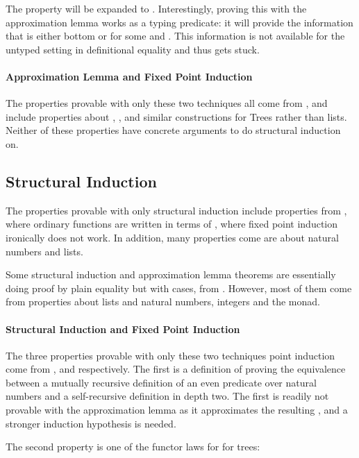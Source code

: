 \noindent
The property will be expanded to .
Interestingly, proving this with the approximation lemma works as a
typing predicate: it will provide the information that  is
either bottom or  for some  and . This
information is not available for the untyped setting in definitional
equality and thus gets stuck.


\paragraph{Approximation Lemma and Fixed Point Induction}
The properties provable with only these two techniques all come from
, and include properties about , ,
 and similar constructions for Trees rather than
lists. Neither of these properties have concrete arguments to do
structural induction on.

\subsection{Structural Induction}
\label{sec:strindres}

The properties provable with only structural induction include
properties from , where ordinary functions are written in
terms of , where fixed point induction ironically does not
work. In addition, many properties come are about natural numbers and
lists.

Some structural induction and approximation lemma theorems are
essentially doing proof by plain equality but with cases, from
. However, most of them come from properties about lists and
natural numbers, integers and the  monad.

\paragraph{Structural Induction and Fixed Point Induction}
The three properties provable with only these two techniques point
induction come from ,  and 
respectively. The first is a definition of proving the equivalence
between a mutually recursive definition of an even predicate over
natural numbers and a self-recursive definition in depth two. The
first is readily not provable with the approximation lemma as it
approximates the resulting , and a stronger induction
hypothesis is needed.

The second property is one of the functor laws for  for trees:

